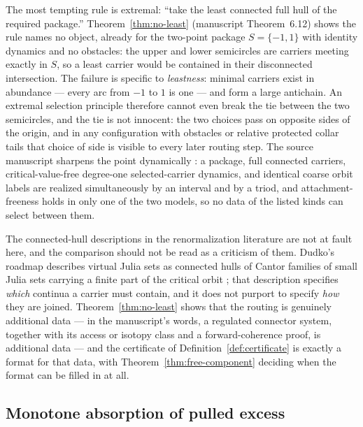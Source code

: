 The most tempting rule is extremal: ``take the least connected full hull
of the required package.''  Theorem~\ref{thm:no-least} (manuscript
Theorem~6.12) shows the rule names no object, already for the two-point
package $S=\{-1,1\}$ with identity dynamics and no obstacles: the upper
and lower semicircles are carriers meeting exactly in $S$, so a least
carrier would be contained in their disconnected intersection.  The
failure is specific to \emph{leastness}: minimal carriers exist in
abundance --- every arc from $-1$ to $1$ is one --- and form a large
antichain.  An extremal selection principle therefore cannot even break
the tie between the two semicircles, and the tie is not innocent: the two
choices pass on opposite sides of the origin, and in any configuration
with obstacles or relative protected collar tails that choice of side is visible to
every later routing step.  The source manuscript sharpens the point
dynamically \cite[Proposition~6.11]{MWman}: a package, full connected
carriers, critical-value-free degree-one selected-carrier dynamics, and
identical coarse orbit labels are realized simultaneously by an interval
and by a triod, and attachment-freeness holds in only one of the two
models, so no data of the listed kinds can select between them.

The connected-hull descriptions in the renormalization
literature are not at fault here, and the comparison should not be read
as a criticism of them.  Dudko's roadmap describes virtual Julia sets as
connected hulls of Cantor families of small Julia sets carrying a finite
part of the critical orbit \cite{Dud25}; that description specifies
\emph{which} continua a carrier must contain, and it does not purport to
specify \emph{how} they are joined.  Theorem~\ref{thm:no-least} shows
that the routing is genuinely additional data --- in the manuscript's
words, a regulated connector system, together with its access or isotopy
class and a forward-coherence proof, is additional data \cite{MWman} ---
and the certificate of Definition~\ref{def:certificate} is exactly a
format for that data, with Theorem~\ref{thm:free-component} deciding when
the format can be filled in at all.

\subsection{Monotone absorption of pulled excess}
\label{subsec:A-comp-absorption}

